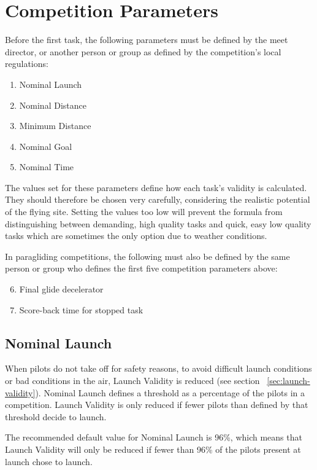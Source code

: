 \documentclass{article}
\begin{document}
\newpage
\section{Competition Parameters}
Before the first task, the following parameters must be defined by the meet
director, or another person or group as defined by the competition’s local
regulations:
\begin{enumerate}
    \item Nominal Launch
    \item Nominal Distance
    \item Minimum Distance
    \item Nominal Goal
    \item Nominal Time
\end{enumerate}
The values set for these parameters define how each task’s validity is
calculated. They should therefore be chosen very carefully, considering the
realistic potential of the flying site. Setting the values too low will prevent
the formula from distinguishing between demanding, high quality tasks and
quick, easy low quality tasks which are sometimes the only option due to
weather conditions.

\begin{pg}
In paragliding competitions, the following must also be defined by the same
person or group who defines the first five competition parameters above:
\begin{enumerate}
    \setcounter{enumi}{5}
    \item Final glide decelerator
    \item Score-back time for stopped task
\end{enumerate}
\end{pg}

\subsection{Nominal Launch}
\label{sec:nominal-launch}
When pilots do not take off for safety reasons, to avoid difficult launch
conditions or bad conditions in the air, Launch Validity is reduced (see
section ~\ref{sec:launch-validity}). Nominal Launch defines a threshold as a percentage of the pilots
in a competition. Launch Validity is only reduced if fewer pilots than defined
by that threshold decide to launch.

The recommended default value for Nominal Launch is 96\%, which means that
Launch Validity will only be reduced if fewer than 96\% of the pilots present at
launch chose to launch.
\end{document}
